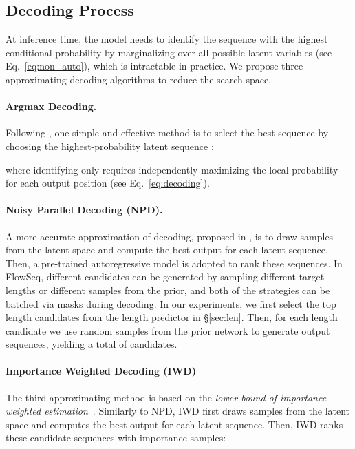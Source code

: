 \documentclass[11pt,a4paper]{article}
\begin{document}
\vspace{-2mm}
\subsection{Decoding Process}
At inference time, the model needs to identify the sequence with the highest conditional probability by marginalizing over all possible latent variables (see Eq.~\eqref{eq:non_auto}), which is intractable in practice.
We propose three approximating decoding algorithms to reduce the search space.
\vspace{-2mm}
\paragraph{Argmax Decoding.} 
Following \citet{gu2018non}, one simple and effective method is to select the best sequence by choosing the highest-probability latent sequence :

where identifying  only requires independently maximizing the local probability for each output position (see Eq.~\ref{eq:decoding}).

\paragraph{Noisy Parallel Decoding (NPD).}
A more accurate approximation of decoding, proposed in \citet{gu2018non}, is to draw samples from the latent space and compute the best output for each latent sequence.
Then, a pre-trained autoregressive model is adopted to rank these sequences.
In FlowSeq, different candidates can be generated by sampling different target lengths or different samples from the prior, and both of the strategies can be batched via masks during decoding.
In our experiments, we first select the top  length candidates from the length predictor in \S\ref{sec:len}.
Then, for each length candidate we use  random samples from the prior network to generate output sequences, yielding a total of  candidates.

\paragraph{Importance Weighted Decoding (IWD)}
The third approximating method is based on the \emph{lower bound of importance weighted estimation}~\citep{burda2015importance}.
Similarly to NPD, IWD first draws samples from the latent space and computes the best output for each latent sequence.
Then, IWD ranks these candidate sequences with  importance samples:
\end{document}
